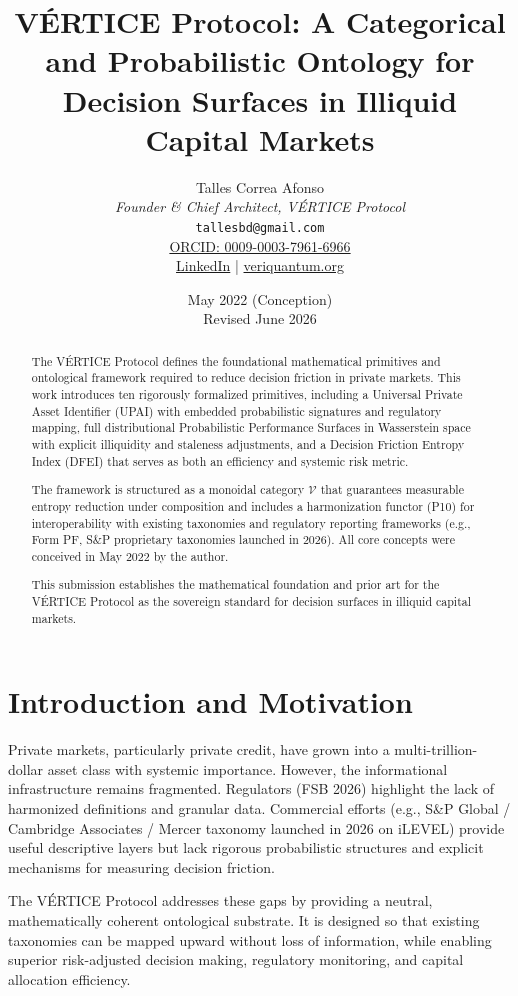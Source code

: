 \documentclass[11pt,a4paper]{article}
\title{\textbf{VÉRTICE Protocol: A Categorical and Probabilistic Ontology for Decision Surfaces in Illiquid Capital Markets}}
\author{
Talles Correa Afonso \\
\textit{Founder \& Chief Architect, VÉRTICE Protocol} \\
\texttt{tallesbd@gmail.com} \\
\href{https://orcid.org/0009-0003-7961-6966}{ORCID: 0009-0003-7961-6966} \\
\href{https://www.linkedin.com/in/engtallescorrea/}{LinkedIn} | \href{https://veriquantum.org}{veriquantum.org}
}
\date{May 2022 (Conception) \\ Revised June 2026}
\begin{document}
\maketitle

\begin{abstract}
The VÉRTICE Protocol defines the foundational mathematical primitives and ontological framework required to reduce decision friction in private markets. This work introduces ten rigorously formalized primitives, including a Universal Private Asset Identifier (UPAI) with embedded probabilistic signatures and regulatory mapping, full distributional Probabilistic Performance Surfaces in Wasserstein space with explicit illiquidity and staleness adjustments, and a Decision Friction Entropy Index (DFEI) that serves as both an efficiency and systemic risk metric.

The framework is structured as a monoidal category $\mathcal{V}$ that guarantees measurable entropy reduction under composition and includes a harmonization functor (P10) for interoperability with existing taxonomies and regulatory reporting frameworks (e.g., Form PF, S\&P proprietary taxonomies launched in 2026). All core concepts were conceived in May 2022 by the author.

This submission establishes the mathematical foundation and prior art for the VÉRTICE Protocol as the sovereign standard for decision surfaces in illiquid capital markets.
\end{abstract}

\section{Introduction and Motivation}

Private markets, particularly private credit, have grown into a multi-trillion-dollar asset class with systemic importance. However, the informational infrastructure remains fragmented. Regulators (FSB 2026) highlight the lack of harmonized definitions and granular data. Commercial efforts (e.g., S\&P Global / Cambridge Associates / Mercer taxonomy launched in 2026 on iLEVEL) provide useful descriptive layers but lack rigorous probabilistic structures and explicit mechanisms for measuring decision friction.

The VÉRTICE Protocol addresses these gaps by providing a neutral, mathematically coherent ontological substrate. It is designed so that existing taxonomies can be mapped upward without loss of information, while enabling superior risk-adjusted decision making, regulatory monitoring, and capital allocation efficiency.
\end{document}
